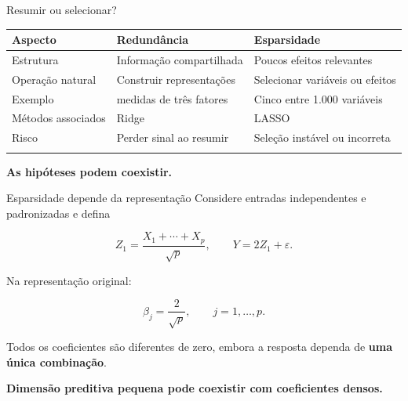 \documentclass[
  10pt,
  ignorenonframetext,
  aspectratio=169,
  brazilian,
]{beamer}
\newcounter{none} %
\begin{document}
\begin{frame}{Resumir ou selecionar?}
\protect{}\label{resumir-ou-selecionar}
{\def\LTcaptype{none} %
\begin{longtable}[]{@{}
  >{\raggedright\arraybackslash}p{}
  >{\raggedright\arraybackslash}p{}
  >{\raggedright\arraybackslash}p{}@{}}
\toprule\noalign{}
\begin{minipage}[b]{\linewidth}\raggedright
Aspecto
\end{minipage} & \begin{minipage}[b]{\linewidth}\raggedright
Redundância
\end{minipage} & \begin{minipage}[b]{\linewidth}\raggedright
Esparsidade
\end{minipage} \\
\midrule\noalign{}
\endhead
Estrutura & Informação compartilhada & Poucos efeitos relevantes \\
Operação natural & Construir representações & Selecionar variáveis ou
efeitos \\
Exemplo & 100 medidas de três fatores & Cinco entre 1.000 variáveis \\
Métodos associados & Ridge & LASSO \\
Risco & Perder sinal ao resumir & Seleção instável ou incorreta \\
\bottomrule\noalign{}
\end{longtable}
}

\textbf{As hipóteses podem coexistir.}

\end{frame}

\begin{frame}{Esparsidade depende da representação}
\protect{}\label{esparsidade-depende-da-representauxe7uxe3o}
Considere entradas independentes e padronizadas e defina

\[
Z_1=\frac{X_1+\cdots+X_p}{\sqrt p},
\qquad Y=2Z_1+\varepsilon.
\]

Na representação original:

\[
\beta_j=\frac{2}{\sqrt p},\qquad j=1,\ldots,p.
\]

Todos os coeficientes são diferentes de zero, embora a resposta dependa
de \textbf{uma única combinação}.

\textbf{Dimensão preditiva pequena pode coexistir com coeficientes
densos.}
\end{frame}
\end{document}
